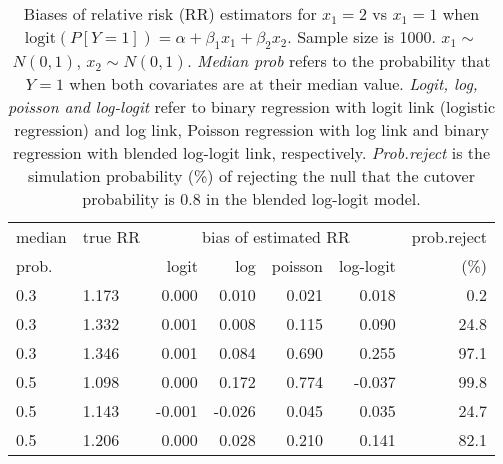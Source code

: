 \documentclass[12pt,a4paper]{article}
\begin{document}
\begin{table}[H] 
\small\sf\centering 
\caption{Biases of relative risk (RR) estimators for $x_1=2$ vs $x_1=1$ when $\mbox{logit}(P[Y=1])=\alpha+\beta_1 x_1 + \beta_2 x_2$. Sample size is 1000. $x_1 \sim $$N(0,1)$, $x_2 \sim N(0,1)$. {\it Median prob} refers to the probability that $Y=1$ when both covariates are at their median value. {\it Logit, log, poisson and log-logit} refer to binary regression with logit link (logistic regression) and log link, Poisson regression with log link and binary regression with blended log-logit link, respectively. {\it Prob.reject} is the simulation probability (\%) of rejecting the null that the cutover probability is $0.8$ in the blended log-logit model.} 
\begin{tabular}{llrrrrr} 
\toprule 
median & true RR & \multicolumn{4}{c}{bias of estimated RR} & prob.reject \\ 
prob. & & logit & log & poisson & log-logit  & (\%) \\ \midrule 
0.3 & 1.173 &  0.000 &  0.010 & 0.021 &  0.018 &  0.2 \\  
0.3 & 1.332 &  0.001 &  0.008 & 0.115 &  0.090 & 24.8 \\  
0.3 & 1.346 &  0.001 &  0.084 & 0.690 &  0.255 & 97.1 \\  
0.5 & 1.098 &  0.000 &  0.172 & 0.774 & -0.037 & 99.8 \\  
0.5 & 1.143 & -0.001 & -0.026 & 0.045 &  0.035 & 24.7 \\  
0.5 & 1.206 &  0.000 &  0.028 & 0.210 &  0.141 & 82.1 \\  
\bottomrule 
\end{tabular} 
\end{table} 
\end{document}
